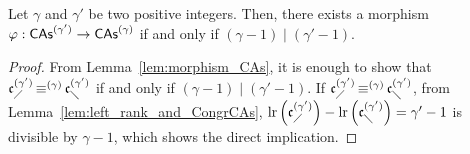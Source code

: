 \begin{Proposition} \label{prop:division_CAs}
    Let $\gamma$ and $\gamma'$ be two positive integers. Then, there
    exists a morphism $\varphi:\mathsf{CAs}^{(\gamma')} \to \mathsf{CAs}^{(\gamma)}$ if and
    only if $\left(\gamma - 1\right) \mid \left(\gamma' - 1\right)$.
\end{Proposition}
\begin{proof}
    From Lemma~\ref{lem:morphism_CAs}, it is enough to show that
    $\mathfrak{c}^{(\gamma')}_{\diagup} \operatorname{\equiv}^{(\gamma)} \mathfrak{c}^{(\gamma')}_{\diagdown}$ if and only if
    $\left(\gamma-1\right) \mid \left(\gamma'-1\right)$. If
    $\mathfrak{c}^{(\gamma')}_{\diagup}\operatorname{\equiv}^{(\gamma)}\mathfrak{c}^{(\gamma')}_{\diagdown}$, from
    Lemma~\ref{lem:left_rank_and_CongrCAs},
    \begin{math}
        \mathrm{lr}\left(\mathfrak{c}^{(\gamma')}_{\diagup}\right)
        - \mathrm{lr}\left(\mathfrak{c}^{(\gamma')}_{\diagdown}\right)
        = \gamma' - 1
    \end{math}
    is divisible by $\gamma-1$, which shows the direct implication.
    \smallbreak


\end{proof}
